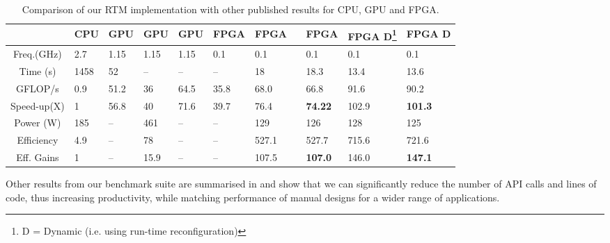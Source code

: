 \begin{table}[!ht]
{\small
  \renewcommand{\arraystretch}{1.5}
  \begin{tabularx}{\linewidth}{c|X|X|X|X|X|X|X|X|X}
    & \textbf{CPU} & \textbf{GPU} \cite{phillips2010implementing} & \textbf{GPU} \cite{datta2008stencil} & \textbf{GPU} \cite{yang2012hybrid}& \textbf{FPGA} \cite{araya2011assessing} & \textbf{FPGA} \cite{Xinyu:Qiwei:Luk:Qiang:Pell:2012} \ & \textbf{FPGA} & \textbf{FPGA D\footnote{D = Dynamic (i.e. using run-time reconfiguration)}} \cite{Xinyu:Qiwei:Luk:Qiang:Pell:2012} & \textbf{FPGA D} \\
    \hline \hline
    Freq.(GHz) & 2.7          & 1.15         &    1.15          &   1.15           &    0.1           & 0.1                 & 0.1                 & 0.1                 & 0.1                 \\
    Time (s)   & 1458         & 52           &    --          &     --         &    --           & 18                  & 18.3                & 13.4                & 13.6                \\
    GFLOP/s    & 0.9          & 51.2         &    36          &     64.5         &    35.8          & 68.0                & 66.8                & 91.6                & 90.2                \\
    Speed-up(X)   & 1           & 56.8        &   40          &     71.6         &     39.7          & 76.4               & \textbf{74.22}     & 102.9              & \textbf{101.3}     \\
    Power (W)  & 185          & --        &    461          &      --        &         --      & 129                 & 126                 & 128                 & 125                 \\
    Efficiency & 4.9          & --        &    78          &       --       &    --           & 527.1               & 527.7               & 715.6               & 721.6               \\
    Eff. Gains & 1           & --        &    15.9          &        --      & --            & 107.5              & \textbf{107.0}     & 146.0             & \textbf{147.1}     \\
  \end{tabularx}
  \caption{Comparison of our RTM implementation with other published results for CPU, GPU and FPGA.}
  \label{table:rtm-performance}
}
\end{table}


Other results from our benchmark suite are summarised in
 and show that we can significantly reduce the
number of API calls and lines of code, thus increasing productivity,
while matching performance of manual designs for a wider range of
applications.

